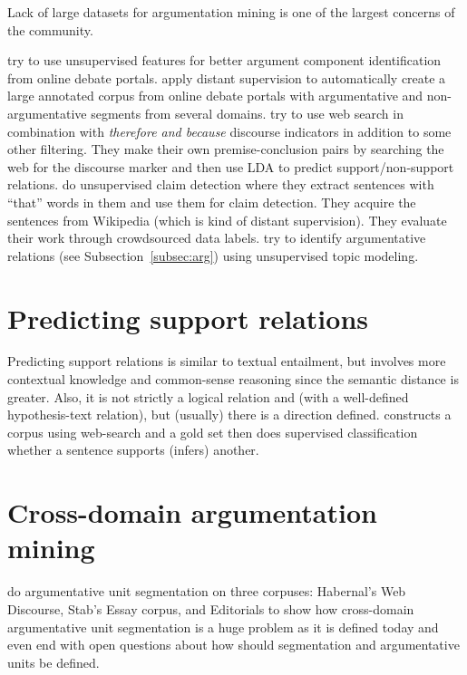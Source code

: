 \documentclass[a4paper,10pt]{article}
\begin{document}
Lack of large datasets for argumentation mining is one of the largest
concerns of the community. 

\cite{habernal2015exploiting} try to use unsupervised features for
better argument component identification from online debate portals. 
\cite{al2016cross} apply distant supervision to automatically create
a large annotated corpus from online debate portals with argumentative and
non-argumentative segments from several domains. 
\cite{Lawrence2017} try to use web search in combination with
\emph{therefore and because} discourse indicators in addition to some
other filtering. They make their own premise-conclusion pairs by searching
the web for the discourse marker and then use LDA to predict
support/non-support relations.
\cite{Levy2017} do unsupervised claim detection where they extract
sentences with ``that'' words in them and use 
them for claim detection. They acquire the sentences 
from Wikipedia (which is kind of distant supervision).
They evaluate their work through crowdsourced data labels. 
\cite{Ferrara2017} try to identify argumentative relations (see
Subsection~\ref{subsec:arg}) using unsupervised topic modeling. 

\section{Predicting support relations}

Predicting support relations is similar to textual entailment, but
involves more contextual knowledge and common-sense reasoning since the
semantic distance is greater. Also, it is not strictly a logical relation
and (with a well-defined hypothesis-text relation), but (usually) there
is a direction defined.
\cite{Lawrence2017} constructs a corpus using web-search and a gold set
then does supervised classification whether a sentence supports (infers)
another. 

\section{Cross-domain argumentation mining}

\cite{Ajjour2017} do argumentative unit segmentation on three corpuses:
Habernal's Web Discourse, Stab's Essay corpus, and Editorials to show
how cross-domain argumentative unit segmentation is a huge problem as it
is defined today and even end with open questions about how should
segmentation and argumentative units be defined. 



\end{document}
